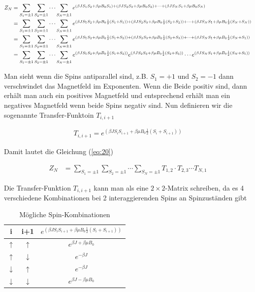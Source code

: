 \begin{align}
  \label{eq:20}
   Z_N &=\sum_{S_1=\pm 1}\sum_{S_2=\pm 1}\cdots \sum_{S_N=\pm 1} e^{(\beta J S_1 S_{2} + \beta \mu B_0 S_1) + (\beta J S_2 S_{3} + \beta \mu B_0 S_2) +\dots+ (\beta J S_N S_1 + \beta \mu B_0 S_N) } \notag\\
&=\sum_{S_1=\pm 1}\sum_{S_2=\pm 1}\cdots \sum_{S_N=\pm 1} e^{(\beta J S_1 S_{2} + \beta \mu B_0\frac{1}{2}(S_1+S_1)) + (\beta J S_2 S_{3} + \beta \mu B_0 \frac{1}{2}(S_2+S_2)) +\dots+ (\beta J S_N S_1 + \beta \mu B_0 \frac{1}{2}(S_N+S_N)) } \notag\\
&=\sum_{S_1=\pm 1}\sum_{S_2=\pm 1}\cdots \sum_{S_N=\pm 1} e^{(\beta J S_1 S_{2} + \beta \mu B_0\frac{1}{2}(S_1+S_2)) + (\beta J S_2 S_{3} + \beta \mu B_0 \frac{1}{2}(S_2+S_3)) +\dots+ (\beta J S_N S_1 + \beta \mu B_0 \frac{1}{2}(S_N+S_1)) } \notag\\
&=\sum_{S_1=\pm 1}\sum_{S_2=\pm 1}\cdots \sum_{S_N=\pm 1} e^{(\beta J S_1 S_{2} + \beta \mu B_0\frac{1}{2}(S_1+S_2))}e^{(\beta J S_2 S_{3} + \beta \mu B_0 \frac{1}{2}(S_2+S_3))}\cdots e^{(\beta J S_N S_1 + \beta \mu B_0 \frac{1}{2}(S_N+S_1)) } \notag\\
\end{align}

Man sieht wenn die Spins antiparallel sind, z.B. \(S_1=+1\) und \(S_2=-1\) dann verschwindet das Magnetfeld im Exponenten. Wenn die Beide positiv sind, dann erhält man auch ein positives Magnetfeld und entsprechend erhält man ein negatives Magnetfeld wenn beide Spins negativ sind.  Nun definieren wir die sogenannte Transfer-Funktoin \(T_{i,i+1}\)

\begin{align}
  \label{eq:21}
  T_{i,i+1}= e^{(\beta J S_i S_{i+1} + \beta \mu B_0\frac{1}{2}(S_i+S_{i+1}))}
\end{align}

Damit lautet die Gleichung (\ref{eq:20})

\begin{align}
  \label{eq:22}
   Z_N &=\sum_{S_1=\pm 1}\sum_{S_2=\pm 1}\cdots \sum_{S_N=\pm 1} T_{1,2}\cdot T_{2,3}\cdots T_{N,1}
\end{align}

Die Transfer-Funktion \(T_{i,i+1}\) kann man als eine \(2\times 2\)-Matrix schreiben, da es 4 verschiedene Kombinationen bei 2 interaggierenden Spins an Spinzuständen gibt

\begin{table}[h]
  \centering
  \begin{tabular}{ccc}
    i&i+1&\( e^{(\beta J S_i S_{i+1} + \beta \mu B_0\frac{1}{2}(S_i+S_{i+1}))} \) \\
\hline
\hline
    \(\uparrow\)&\(\uparrow\)& \( e^{\beta J  + \beta \mu B_0 } \)  \\
\hline
    \(\uparrow\)&\(\downarrow\)& \( e^{-\beta J } \)   \\
\hline
    \(\downarrow\)&\(\uparrow\)& \( e^{-\beta J } \)  \\
\hline
    \(\downarrow\)&\(\downarrow\)& \( e^{\beta J  - \beta \mu B_0 } \)
  \end{tabular}
  \caption{Mögliche Spin-Kombinationen}
  \label{tab:1}
\end{table}

